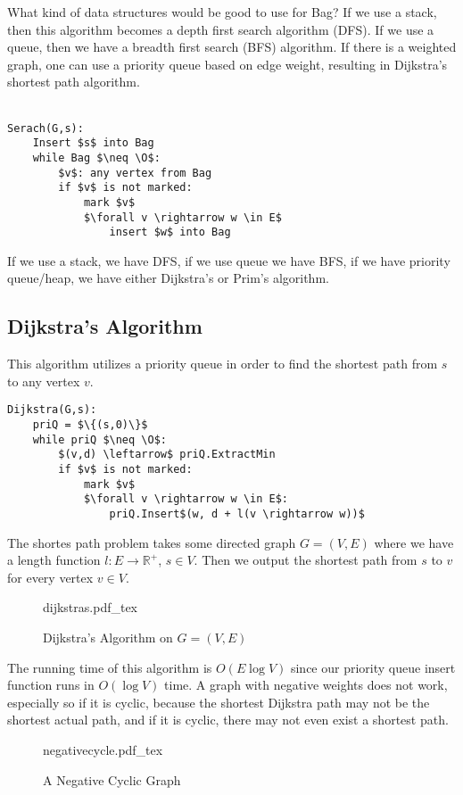 \documentclass{article}
\newcommand{\incfig}[1]{%
    \def\svgwidth{\columnwidth}
    {#1.pdf_tex}
}
\theoremstyle{definition}
\begin{document}
What kind of data structures would be good to use for Bag? If 
we use a stack, then this algorithm becomes a depth first search algorithm (DFS).
If we use a queue, then we have a breadth first search (BFS) algorithm.
If there is a weighted graph, one can use a priority queue based on edge weight,
resulting in Dijkstra's shortest path algorithm.\\\\
\begin{lstlisting}[mathescape=true]
Serach(G,s):
    Insert $s$ into Bag
    while Bag $\neq \O$:
        $v$: any vertex from Bag
        if $v$ is not marked:
            mark $v$
            $\forall v \rightarrow w \in E$
                insert $w$ into Bag
\end{lstlisting}
If we use a stack, we have DFS, if we use queue we have BFS, if we have priority queue/heap, we have
either Dijkstra's or Prim's algorithm.
\subsection*{Dijkstra's Algorithm}
This algorithm utilizes a priority queue in order to find the shortest path from $s$
to any vertex $v$.
\begin{lstlisting}[mathescape=true]
Dijkstra(G,s):
    priQ = $\{(s,0)\}$
    while priQ $\neq \O$:
        $(v,d) \leftarrow$ priQ.ExtractMin
        if $v$ is not marked:
            mark $v$
            $\forall v \rightarrow w \in E$:
                priQ.Insert$(w, d + l(v \rightarrow w))$
\end{lstlisting}
The shortes path problem takes some directed graph $G = (V,E)$ where we have a length function $l: E \rightarrow \mathbb{R}^+$,
$s \in V$. Then we output the shortest path from $s$ to $v$ for every vertex $v \in V$.
\begin{figure}[ht]
    \centering
    \incfig{dijkstras}
    \caption{Dijkstra's Algorithm on $G = (V,E)$}
    \label{fig:dijkstras}
\end{figure}
The running time of this algorithm is $O(E \log V)$ since our priority queue insert function runs in $O(\log V)$ time.
A graph with negative weights does not work, especially so if it is cyclic, because the shortest Dijkstra path may not be 
the shortest actual path, and if it is cyclic, there may not even exist a shortest path.
\begin{figure}[ht]
    \centering
    \incfig{negativecycle}
    \caption{A Negative Cyclic Graph}
    \label{fig:negativecycle}
\end{figure}
\end{document}
